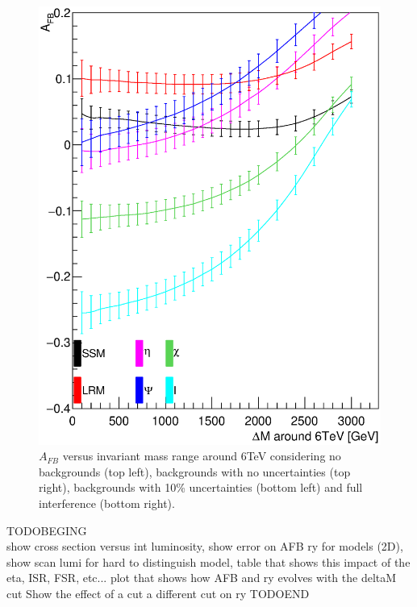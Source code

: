 \begin{figure}[!htb]
   \includegraphics[width=0.45\columnwidth]{Fig/afb_vs_dm_interf.eps}
  \caption{$A_{FB}$ versus invariant mass range around 6TeV considering no backgrounds (top left), backgrounds with no uncertainties (top right), backgrounds with 10\% uncertainties (bottom left) and full interference (bottom right).}
  \label{figure:lepana:afb_dm}
\end{figure}


\label{subsubsection:results}
TODOBEGING\\
show cross section versus int luminosity, show error on AFB ry for models (2D), show scan lumi for hard to distinguish model, table that shows this impact of the eta, ISR, FSR, etc...
plot that shows how AFB and ry evolves with the deltaM cut
Show the effect of a cut a different cut on ry
TODOEND\\

